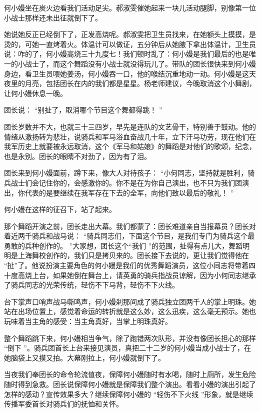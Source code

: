 \documentclass[12pt,twoside,openany]{book}
\begin{document}
何小嫚坐在炭火边看我们活动足尖。郝淑雯催她起来一块儿活动腿脚，别像第一位小战士那样还未出征就倒下了。

她说她反正已经倒下了，正发高烧呢。郝淑雯把卫生员找来，在她额头上摸摸，是烫的，可她一直烤着火。体温计可以做证，五分钟后从她腋下拿出体温计，卫生员说：咋的了，何小嫚高烧三十九度七！我们顿时乱了：何小嫚是我们最后的也是唯一的小战士了，而这个舞蹈没有小战士就没得玩儿了。带队的团长很快来到何小嫚身边，看卫生员喂她姜汤，何小嫚吞一口，他的喉结沉重地动一动。何小嫚是这天夜里的月亮，包括团长在内的我们都是星星。杨老师建议，今晚取消这个小舞剧，让何小嫚休息一晚。

团长说： “别扯了，取消哪个节目这个舞都得跳！ ”

团长岁数并不大，也就三十三四岁，早先是连队的文艺骨干，特别善于鼓动。他的情绪从激扬转为悲壮，说骑兵和军马浴血奋战几十年，立下汗马功劳，现在他们在我军历史上就要被永远取消，这个《军马和姑娘》的舞蹈是对他们的歌颂，纪念，也是永别。团长的眼睛不对劲了，因为有了泪。

团长来到何小嫚面前，蹲下来，像大人对待孩子： “小何同志，坚持就是胜利，骑兵战士们会记住你的，会感激你的。你不是在为你自己演出，也不只为我们团演出，你代表的是要继续在我军存在下去的全军，向他们致以最后的敬礼！ ”

何小嫚在这样的征召下，站了起来。

那个舞蹈开演之前，团长走出大幕。我们都蒙了：团长难道亲自当报幕员？团长对着近两千骑兵和战马说： “骑兵同志们，下面这个节目，是我们专门为骑兵这个最勇敢的兵种创作的。 ”大家想，团长这个“我们 ”的范围，扯得有点儿大，舞蹈明明是上海舞校创作的，我们只是拷贝来的。团长接下去说的，更让我们觉得他在 “扯”了。他说扮演主要角色的何小嫚是我们的优秀舞蹈演员，这位小同志将带着四十度高烧上台，如果她倒在舞台上，请英勇的骑兵指战员谅解，因为小何同志继承了骑兵同志的光荣传统，轻伤不下马背，轻伤不下火线。

台下掌声口哨声战马嘶鸣声，何小嫚刹那间成了骑兵独立团两千人的掌上明珠。她站在出场位置上，感觉着命运的转折就是这么妙，这么迅疾，这么毫无预示。她也玩味着当主角的感受：当主角真好，当掌上明珠真好。

整个舞蹈跳下来，何小嫚相当争气，除了跑错两次队形，并没有像团长担心的那样 “倒下 ”。骑兵团首长上台来接见演员，真把二十二岁的何小嫚当成小战士了，在她脑袋上又摸又拍。大幕刚拉上，何小嫚就倒下了。

当夜我们奉团长的命令轮流值夜，保障何小嫚随时有水喝，随时上厕所，发生危险随时得到急救。团长说保障何小嫚就是保障我们整个演出。看看小嫚的演出引起了怎样的感动？宣传效果多大？继续保障何小嫚的 “轻伤不下火线 ”形象，就是继续传播军委首长对骑兵们的抚恤和关怀。
\end{document}
